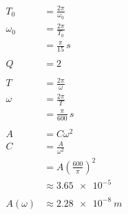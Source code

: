 \documentclass{article}
\begin{document}
\begin{enumerate}
        \begin{align*}
          T_0       & = \frac{2 \pi}{\omega_0}             \\
          \omega_0  & = \frac{2 \pi}{T_0}                  \\
                    & = \frac{\pi}{15} \,\unit{s}          \\ \\
          Q         & = 2                                  \\ \\
          T         & = \frac{2 \pi}{\omega}               \\
          \omega    & = \frac{2 \pi}{T}                    \\
                    & = \frac{\pi}{600} \,\unit{s}         \\ \\
          A         & = C \omega^2                         \\
          C         & = \frac{A}{\omega^2}                 \\
                    & = A \left( \frac{600}{\pi} \right)^2 \\
                    & \approx \num{3.65e-5}                \\ \\
          A(\omega) & \approx \qty{2.28e-8}{m}
        \end{align*}
\end{enumerate}

\setcounter{subsection}{7}
\subsection{}
\end{document}

